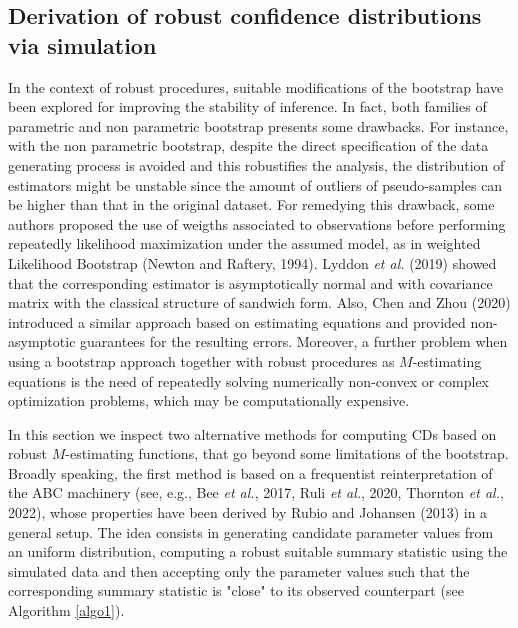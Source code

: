 \documentclass[preprint,12pt,authoryear]{elsarticle}
\begin{document}
%




\subsection{Derivation of robust confidence distributions via simulation}
 
In the context of robust procedures, suitable modifications of the bootstrap have been explored for improving the stability of inference. In fact, both families of  parametric and non parametric bootstrap presents some drawbacks. For instance, with the non parametric bootstrap, despite  the direct specification of the data generating process is avoided and this robustifies the analysis, the distribution of estimators might be unstable since the amount of outliers
 of pseudo-samples can be higher than that in the original dataset. 
For remedying this drawback, some authors proposed the use of weigths associated to observations  before performing repeatedly likelihood maximization  under the assumed model, as in  weighted Likelihood Bootstrap (Newton and Raftery, 1994). Lyddon {\em et al.}  (2019) showed that the corresponding estimator is asymptotically normal and with covariance matrix with the classical structure of sandwich form. Also, Chen and Zhou (2020) introduced a  similar approach based on estimating equations and provided non-asymptotic guarantees for the resulting errors.
Moreover, a further problem when using a bootstrap approach together  with robust procedures as  $M$-estimating equations is the need of repeatedly solving numerically non-convex or complex optimization problems, which may be computationally expensive.

In this section we inspect two alternative methods for computing  CDs based on robust $M$-estimating functions, that go beyond some limitations of the bootstrap.
Broadly speaking, the first method is based on a frequentist reinterpretation of the ABC machinery (see, e.g., Bee {\em et al.}, 2017, Ruli {\em et al.}, 2020, Thornton {\em et al.}, 2022), whose properties have been derived by Rubio and Johansen (2013) in a general setup. The idea consists in generating candidate parameter values from an uniform distribution, computing a robust suitable summary statistic using the simulated data and then accepting only the parameter values such that the corresponding summary statistic is "close" to its observed counterpart (see Algorithm \ref{algo1}).
 
\end{document}
